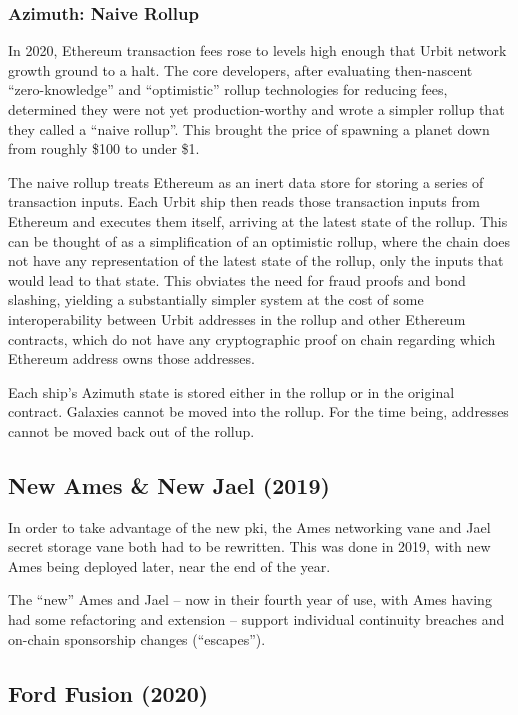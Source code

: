 \documentclass[twoside]{article}
\begin{document}
\subsubsection{Azimuth: Naive Rollup}

In 2020, Ethereum transaction fees rose to levels high enough that Urbit network growth ground to a halt.  The core developers, after evaluating then-nascent ``zero-knowledge'' and ``optimistic'' rollup technologies for reducing fees, determined they were not yet production-worthy and wrote a simpler rollup that they called a ``naive rollup''.  This brought the price of spawning a planet down from roughly \$100 to under \$1.

The naive rollup treats Ethereum as an inert data store for storing a series of transaction inputs.  Each Urbit ship then reads those transaction inputs from Ethereum and executes them itself, arriving at the latest state of the rollup.  This can be thought of as a simplification of an optimistic rollup, where the chain does not have any representation of the latest state of the rollup, only the inputs that would lead to that state.  This obviates the need for fraud proofs and bond slashing, yielding a substantially simpler system at the cost of some interoperability between Urbit addresses in the rollup and other Ethereum contracts, which do not have any cryptographic proof on chain regarding which Ethereum address owns those addresses.

Each ship's Azimuth state is stored either in the rollup or in the original contract.  Galaxies cannot be moved into the rollup.  For the time being, addresses cannot be moved back out of the rollup.

\subsection{New Ames \& New Jael (2019)}

In order to take advantage of the new {\sc pki}, the Ames networking vane and Jael secret storage vane both had to be rewritten.  This was done in 2019, with new Ames being deployed later, near the end of the year.  

The ``new'' Ames and Jael – now in their fourth year of use, with Ames having had some refactoring and extension – support individual continuity breaches and on-chain sponsorship changes (``escapes'').  

\subsection{Ford Fusion (2020)}
\end{document}
